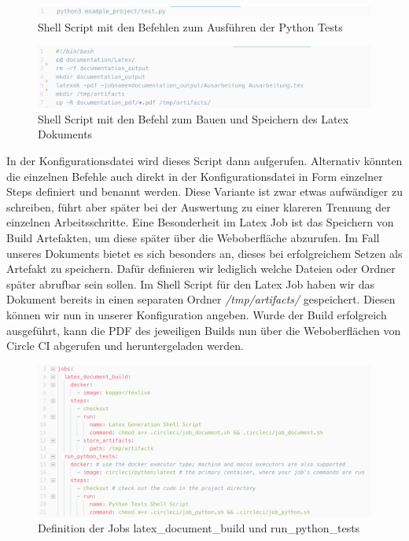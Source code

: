 \documentclass[11pt]{article}
\begin{document}
\begin{figure}[H]
	\centering
  	\includegraphics[width=1\linewidth]{../Images/Config/Python}
  	\caption{Shell Script mit den Befehlen zum Ausführen der Python Tests}
  	\label{fig:python}
\end{figure}

\begin{figure}[H]
	\centering
  	\includegraphics[width=1\linewidth]{../Images/Config/Latex}
  	\caption{Shell Script mit den Befehl zum Bauen und Speichern des Latex Dokuments}
  	\label{fig:latex}
\end{figure}

In der Konfigurationsdatei wird dieses Script dann aufgerufen. Alternativ könnten die einzelnen Befehle auch direkt in der Konfigurationsdatei in Form einzelner Steps definiert und benannt werden. Diese Variante ist zwar etwas aufwändiger zu schreiben, führt aber später bei der Auswertung zu einer klareren Trennung der einzelnen Arbeitsschritte.
Eine Besonderheit im Latex Job ist das Speichern von Build Artefakten, um diese später über die Weboberfläche abzurufen. Im Fall unseres Dokuments bietet es sich besonders an, dieses bei erfolgreichem Setzen als Artefakt zu speichern. Dafür definieren wir lediglich welche Dateien oder Ordner später abrufbar sein sollen. Im Shell Script für den Latex Job haben wir das Dokument bereits in einen separaten Ordner \textit{/tmp/artifacts/} gespeichert. Diesen können wir nun in unserer Konfiguration angeben. Wurde der Build erfolgreich ausgeführt, kann die PDF des jeweiligen Builds nun über die Weboberflächen von Circle CI abgerufen und heruntergeladen werden.

\begin{figure}[H]
	\centering
  	\includegraphics[width=1\linewidth]{../Images/Config/Jobs}
  	\caption{Definition der Jobs latex\_document\_build und run\_python\_tests}
  	\label{fig:jobs}
\end{figure}
\end{document}
